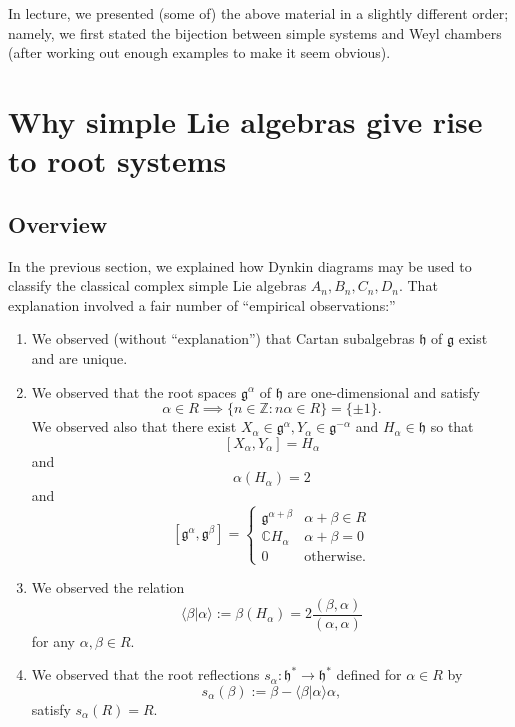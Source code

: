 \documentclass[reqno]{amsart} 
\begin{document}
In lecture, we presented (some of) the above material in a slightly different order; namely, we first stated the bijection between simple systems and Weyl chambers (after working out enough examples to make it seem obvious).


\section{Why simple Lie algebras give rise to root systems}
\label{sec:orgbc4b3b3}

\subsection{Overview\label{sec:overview:simple-lie-alg-induce-root-systems}}
\label{sec:orgca704ad}
In the previous section, we explained how Dynkin diagrams may be used to classify the classical complex simple Lie algebras $A_n,B_n,C_n,D_n$.  That explanation involved a fair number of ``empirical observations:''
\begin{enumerate}
\item We observed (without ``explanation'') that Cartan subalgebras $\mathfrak{h}$ of $\mathfrak{g}$ exist and are unique.
\item We observed that the root spaces $\mathfrak{g}^\alpha$ of $\mathfrak{h}$ are one-dimensional and satisfy
  \begin{equation*}
    \alpha \in R \implies \{n \in \mathbb{Z} : n \alpha \in R\} = \{\pm 1\}.
  \end{equation*}
  We observed also that there exist $X_\alpha \in \mathfrak{g}^\alpha, Y_\alpha \in \mathfrak{g}^{-\alpha}$ and $H_\alpha \in \mathfrak{h}$ so that
  \begin{equation*}
    {} [X_\alpha,Y_\alpha] = H_\alpha
  \end{equation*}
  and
  \begin{equation*}
    \alpha(H_\alpha) = 2
  \end{equation*}
  and
  \begin{equation*}
    {} [\mathfrak{g}^\alpha, \mathfrak{g}^\beta]
    = 
\begin{cases}
      \mathfrak{g}^{\alpha+\beta} & \alpha + \beta \in R \\
      \mathbb{C} H_\alpha  & \alpha + \beta = 0 \\
      0 & \text{otherwise.}
    \end{cases}
  \end{equation*}
\item We observed the relation
  \begin{equation*}
    \langle \beta | \alpha \rangle := \beta(H_\alpha) = 2 \frac{(\beta,\alpha)}{(\alpha,\alpha)}
  \end{equation*}
  for any $\alpha, \beta \in R$.
\item We observed that the root reflections $s_\alpha : \mathfrak{h}^* \rightarrow \mathfrak{h}^*$ defined for $\alpha \in R$ by
  \begin{equation*}
    s_\alpha (\beta) := \beta - \langle \beta|\alpha \rangle \alpha,
  \end{equation*}
  satisfy $s_\alpha(R) = R$.
\end{enumerate}
\end{document}
